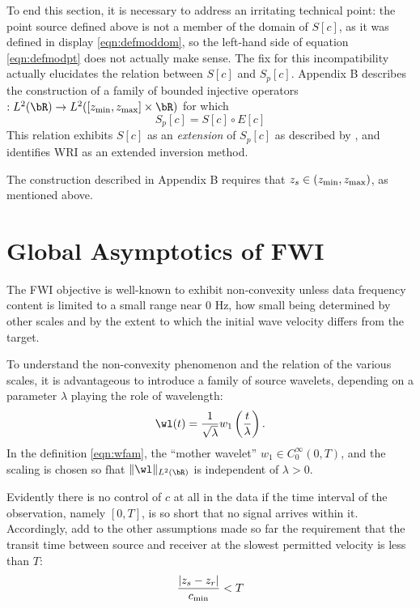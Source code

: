 To end this section, it is necessary to address an irritating technical point: the point source defined above is not a member of the domain of $S[c]$, as it was defined in display \ref{eqn:defmoddom}, so the left-hand side of equation \ref{eqn:defmodpt} does not actually make sense. The fix for this incompatibility actually elucidates the relation between $S[c]$ and $S_p[c]$. Appendix B describes the construction of a family of bounded injective operators  $:L^2(\bR) \rightarrow L^2([z_{\rm min},z_{\rm max}] \times \bR)$ for which
\begin{equation}
  \label{eqn:ext}
  S_p[c] = S[c] \circ E[c]
\end{equation}
This relation exhibits $S[c]$ as an {\em extension} of $S_p[c]$ as
described by \cite{Symes:09}, and identifies WRI as an extended
inversion method.

The construction described in Appendix B requires that $z_s \in
(z_{\rm min},z_{\rm max})$, as mentioned above.

\section{Global Asymptotics of FWI}
The FWI objective is well-known to exhibit non-convexity unless
data frequency content is limited to a small range near 0 Hz, how
small being determined by other scales and by the extent to which the
initial wave velocity differs from the target.

To understand the non-convexity phenomenon and the
relation of the various scales, it is advantageous to introduce a
family of source wavelets, depending on a parameter $\lambda$ playing
the role of wavelength:
\begin{equation}
  \label{eqn:wfam}
  \wl(t) = \frac{1}{\sqrt{\lambda}}w_1\left(\frac{t}{\lambda}\right).
\end{equation}
In the definition \ref{eqn:wfam}, the ``mother wavelet'' $w_1\in
C_0^{\infty}(0,T)$, and the scaling is chosen so fhat
$\|\wl\|_{L^2(\bR)}$ is independent of $\lambda>0$.

Evidently there is no control of $c$ at all in the data if the time
interval of the observation, namely $[0,T]$, is so short that no
signal arrives within it. Accordingly, add to the other assumptions
made so far
the requirement that the transit time between source and receiver at
the slowest permitted velocity is less than $T$:
\begin{equation}
  \label{eqn:time}
  \frac{|z_s-z_r|}{c_{\rm min}} < T
\end{equation}

